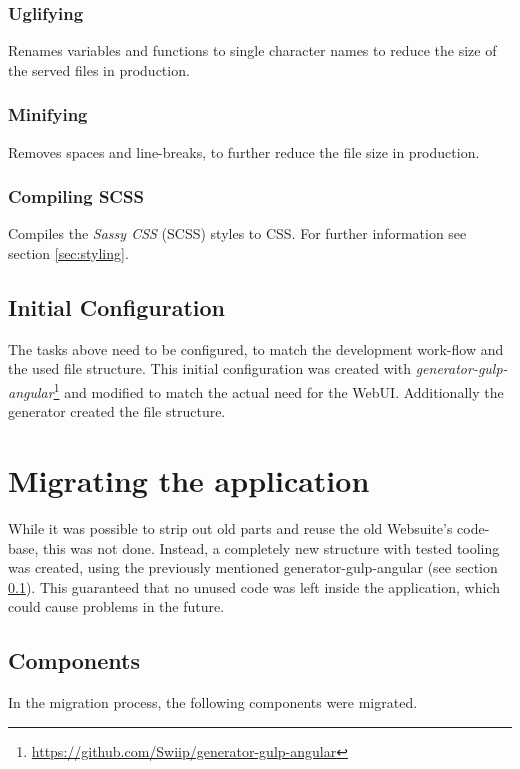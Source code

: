 \subsubsection{Uglifying} Renames variables and functions to single character names to reduce the size of the served files in production.

\subsubsection{Minifying} Removes spaces and line-breaks, to further reduce the file size in production.

\subsubsection{Compiling SCSS}
Compiles the \textit{Sassy CSS} (SCSS) styles to CSS. For further information see section \ref{sec:styling}.


\subsection{Initial Configuration}
\label{sec:initial_config}
The tasks above need to be configured, to match the development work-flow and the used file structure. This initial configuration was created with \textit{generator-gulp-angular}\footnote{\url{https://github.com/Swiip/generator-gulp-angular}} and modified to match the actual need for the WebUI. Additionally the generator created the file structure.



\section{Migrating the application}
While it was possible to strip out old parts and reuse the old Websuite's code-base, this was not done. Instead, a completely new structure with tested tooling was created, using the previously mentioned generator-gulp-angular (see section \ref{sec:initial_config}). This guaranteed that no unused code was left inside the application, which could cause problems in the future.


\subsection{Components}
In the migration process, the following components were migrated.

